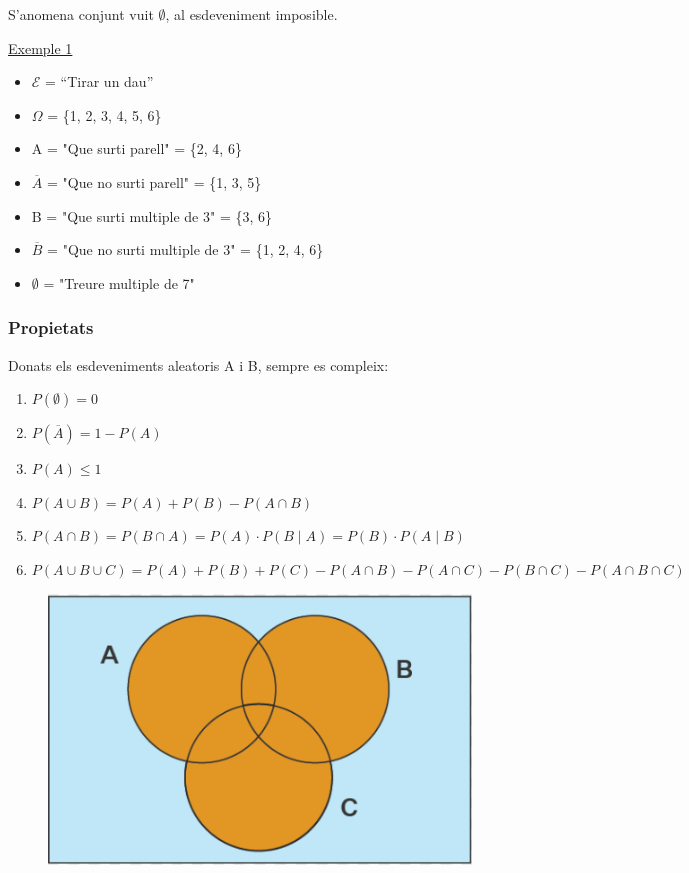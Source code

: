 \documentclass{article}
\begin{document}
S'anomena conjunt vuit $\emptyset$, al esdeveniment imposible.

\underline{Exemple 1}
\begin{itemize}
    \item $\mathcal{E}$ = “Tirar un dau”
    \item $\Omega$ = \{1, 2, 3, 4, 5, 6\}
    \item A = "Que surti parell" = \{2, 4, 6\}
    \item $\overline{A}$ = "Que no surti parell" = \{1, 3, 5\}
    \item B = "Que surti multiple de 3" = \{3, 6\}
    \item $\overline{B}$ = "Que no surti multiple de 3" = \{1, 2, 4, 6\} 
    \item $\emptyset$ = "Treure multiple de 7"
\end{itemize}

\subsubsection{Propietats}

Donats els esdeveniments aleatoris A i B, sempre es compleix:
\begin{enumerate}
    \item $P(\emptyset) = 0$
    \item $P(\overline{A}) = 1 - P(A)$
    \item $P(A) \leq 1$
    \item $P(A \cup B) = P(A) + P(B) - P(A \cap B)$
    \item $P(A \cap B) = P(B \cap A) = P(A) \cdot P(B \mid A) = P(B) \cdot P(A \mid B)$ 
    \item $P(A \cup B \cup C) = P(A) + P(B) + P(C) - P(A \cap B) - P(A \cap C) - P (B \cap C) - P(A \cap B \cap C)$
\end{enumerate}

\begin{figure}[H]
    \includegraphics[scale=0.35]{pictures/image3.png}
    \centering
\end{figure}
\end{document}
